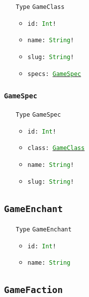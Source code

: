 \documentclass[10pt, a4paper]{memoir}
\numberwithin{equation}{section}
\theoremstyle{plain}
\theoremstyle{defp}
\theoremstyle{dotless}
\theoremstyle{definition}
\theoremstyle{dotless}
\theoremstyle{dotless}
\theoremstyle{defp}
\theoremstyle{defp}
\theoremstyle{be}          %
\theoremstyle{defp}
\newcommand\ttt[1]{\texttt{#1}}
\newcommand\type[1]{\ttt{\textcolor{green}{#1}}}
\begin{document}
\begin{itemize}[noitemsep,topsep=1pt]
\item[\ttt{Type}] \ttt{GameClass}
\begin{itemize}[itemsep=1pt,topsep=1pt]
\item \ttt{id: \type{Int}!}
\item \ttt{name: \type{String}!}
\item \ttt{slug: \type{String}!}
\item \ttt{specs: \hyperref[sec:GameSpec]{\type{GameSpec}}}
\end{itemize}
\end{itemize}

\subsubsection{\ttt{GameSpec}}\label{sec:GameSpec}

\begin{itemize}[noitemsep,topsep=1pt]
\item[\ttt{Type}] \ttt{GameSpec}
\begin{itemize}[itemsep=1pt,topsep=1pt]
\item \ttt{id: \type{Int}!}
\item \ttt{class: \hyperref[sec:GameClass]{\type{GameClass}}}
\item \ttt{name: \type{String}!}
\item \ttt{slug: \type{String}!}
\end{itemize}
\end{itemize}

\subsection{\ttt{GameEnchant}}\label{sec:GameEnchant}

\begin{itemize}[noitemsep,topsep=1pt]
\item[\ttt{Type}] \ttt{GameEnchant}
\begin{itemize}[itemsep=1pt,topsep=1pt]
\item \ttt{id: \type{Int}!}
\item \ttt{name: \type{String}}
\end{itemize}
\end{itemize}

\subsection{\ttt{GameFaction}}\label{sec:GameFaction}
\end{document}
